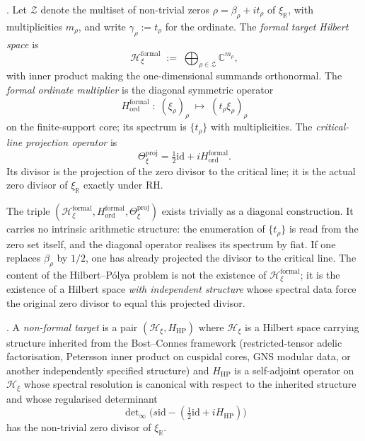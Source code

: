 \begin{definition}
\label{v4-arith:w9-r4:def:target-data}
\ClaimStatusDefinitional. Let \(\mathcal{Z}\) denote the multiset of
non-trivial zeros \(\rho=\beta_{\rho}+it_{\rho}\) of
\(\xi_{\mathbb{R}}\), with multiplicities \(m_{\rho}\), and write
\(\gamma_{\rho}:=t_{\rho}\) for the ordinate. The
\emph{formal target Hilbert space} is
\[
\mathcal{H}_{\xi}^{\mathrm{formal}}\;:=\;\bigoplus_{\rho\in\mathcal{Z}}\mathbb{C}^{m_{\rho}},
\]
with inner product making the one-dimensional summands
orthonormal. The \emph{formal ordinate multiplier} is the
diagonal symmetric operator
\[
H_{\mathrm{ord}}^{\mathrm{formal}}\;:\;(\xi_{\rho})_{\rho}\;\mapsto\;(t_{\rho}\xi_{\rho})_{\rho}
\]
on the finite-support core; its spectrum is
\(\{t_{\rho}\}\) with multiplicities. The \emph{critical-line
projection operator} is
\[
\Theta_{\xi}^{\mathrm{proj}}=\tfrac12\mathrm{id}+iH_{\mathrm{ord}}^{\mathrm{formal}}.
\]
Its divisor is the projection of the zero divisor to the critical
line; it is the actual zero divisor of \(\xi_{\mathbb R}\) exactly
under RH.
\end{definition}

\begin{remark}
\label{v4-arith:w9-r4:rem:why-formal}
The triple \((\mathcal{H}_{\xi}^{\mathrm{formal}},H_{\mathrm{ord}}^{\mathrm{formal}},\Theta_{\xi}^{\mathrm{proj}})\)
exists trivially as a diagonal construction. It carries no
intrinsic arithmetic structure: the enumeration of
\(\{t_{\rho}\}\) is read from the zero set itself, and the diagonal
operator realises its spectrum by fiat. If one replaces
\(\beta_{\rho}\) by \(1/2\), one has already projected the divisor to
the critical line. The content of the Hilbert--P\'olya problem is
not the existence of \(\mathcal{H}_{\xi}^{\mathrm{formal}}\); it is
the existence of a Hilbert space \emph{with independent structure}
whose spectral data force the original zero divisor to equal this
projected divisor.
\end{remark}

\begin{definition}
\label{v4-arith:w9-r4:def:non-formal-target}
\ClaimStatusDefinitional. A \emph{non-formal target} is a pair
\((\mathcal{H}_{\xi},H_{\mathrm{HP}})\) where \(\mathcal{H}_{\xi}\) is a
Hilbert space carrying structure inherited from the Bost--Connes
framework (restricted-tensor adelic factorisation, Petersson inner
product on cuspidal cores, GNS modular data, or another
independently specified structure) and \(H_{\mathrm{HP}}\) is a
self-adjoint operator on \(\mathcal{H}_{\xi}\) whose spectral
resolution is canonical with respect to the inherited structure and
whose regularised determinant
\[
\det\nolimits_{\infty}\bigl(s\mathrm{id}-(\tfrac12\mathrm{id}+iH_{\mathrm{HP}})\bigr)
\]
has the non-trivial zero divisor of \(\xi_{\mathbb R}\).
\end{definition}


